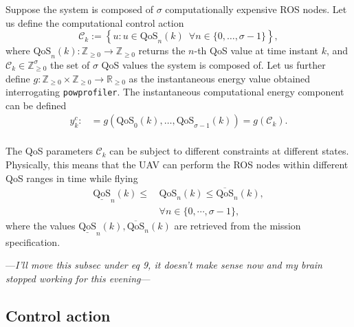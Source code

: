 \documentclass[letterpaper,10pt,conference]{ieeeconf}
\newcommand{\stt}[1]{{\small\tt #1}} %
\newcommand{\powprof}{\stt{powprofiler}}
\begin{document}
Suppose the system is composed of $\sigma$ computationally expensive ROS nodes. Let us define the computational control action
\begin{equation}\label{eq:qos-def}
  \mathcal{C}_k:=\left\{u:u\in\text{QoS}_n(k)\,\,\,\forall n\in\{0,\dots,\sigma-1\}\right\},
\end{equation}
where $\text{QoS}_n(k):\mathbb{Z}_{\geq 0}\rightarrow\mathbb{Z}_{\geq 0}$ returns the $n$-th QoS value at time instant $k$, and $\mathcal{C}_k\in\mathbb{Z}_{\geq 0}^\sigma$ the set of $\sigma$ QoS values the system is composed of. Let us further define $g:\mathbb{Z}_{\geq 0}\times\mathbb{Z}_{\geq 0}\rightarrow\mathbb{R}_{\geq 0}$ as the instantaneous energy value obtained interrogating \powprof{}. The instantaneous computational energy component can be defined
\begin{equation}\label{eq:energy-comp}\begin{split}
  y_k^c:&=g\left(\text{QoS}_0\left(k\right),\dots,\text{QoS}_{\sigma-1}\left(k\right)\right)=g\left(\mathcal{C}_{k}\right).\\
\end{split}\end{equation}

The QoS parameters $\mathcal{C}_k$ can be subject to different constraints at different states. Physically, this means that the UAV can perform the ROS nodes within different QoS ranges in time while flying
\begin{equation}\label{eq:qos-lims}\begin{split}
  \underline{\text{QoS}}_n(k)\leq \,&\text{QoS}_n(k)\leq \overline{\text{QoS}}_n(k),\\
  &\forall n\in\{0,\cdots,\sigma-1\},
\end{split}\end{equation}
where the values $\underline{\text{QoS}}_n(k),\overline{\text{QoS}}_n(k)$ are retrieved from the mission specification.

\begin{center}\vspace{.2cm}---\emph{I'll move this subsec under eq 9, it doesn't make sense now and my brain stopped working for this evening}---\vspace{.6cm}\end{center}

\subsection{Control action}
\label{sec:control-action}
\end{document}
